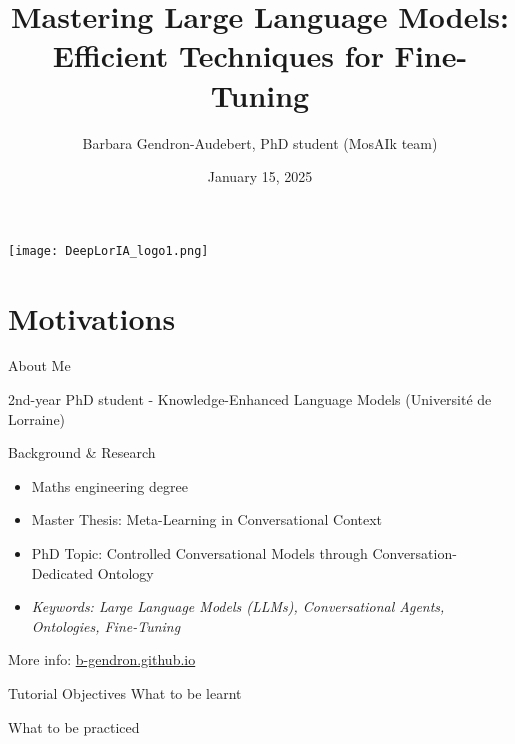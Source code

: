 \documentclass[11pt,aspectratio=169]{beamer}
\author[Barbara Gendron]{\large Barbara Gendron-Audebert, PhD student (MosAIk team)}
\title[Mastering LLM Fine-Tuning]{\huge Mastering Large Language Models: Efficient Techniques for Fine-Tuning}
\date{January 15, 2025}
\institute[DeepLorIA tutorial]{\large LORIA, Université de Lorraine, CNRS\\ DeepLorIA Network}
\begin{document}
\begin{frame}[plain]
    \vspace*{5pt}
    \begin{center}
        \texttt{[image: DeepLorIA\_logo1.png]}
    \end{center}
    \titlepage
\end{frame}

\section{Motivations}

\begin{frame}{About Me}
\begin{center}
    2nd-year PhD student - Knowledge-Enhanced Language Models (Université de Lorraine)
\end{center}
\vspace*{10pt}
Background \& Research
    \begin{itemize}
        \item Maths engineering degree
        \item Master Thesis: Meta-Learning in Conversational Context
        \item PhD Topic: Controlled Conversational Models through Conversation-Dedicated Ontology
        \item \textsl{Keywords: Large Language Models (LLMs), Conversational Agents, Ontologies, Fine-Tuning}
    \end{itemize}

More info: \url{b-gendron.github.io}
\end{frame}

\begin{frame}{Tutorial Objectives}
What to be learnt

What to be practiced
\end{frame}
\end{document}
